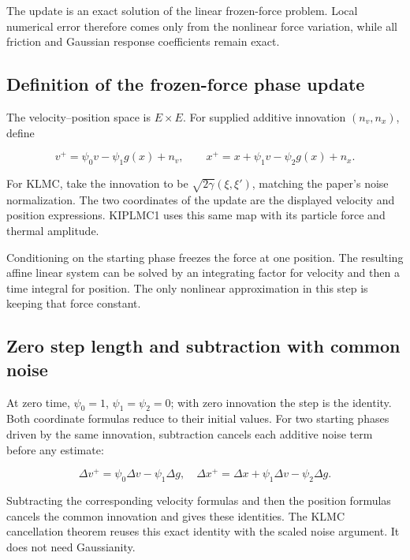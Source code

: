 \documentclass[11pt,a4paper]{report}
\begin{document}
The update is an exact solution of the linear frozen-force problem. Local numerical error therefore comes only from the nonlinear force variation, while all friction and Gaussian response coefficients remain exact.

\subsection{\texorpdfstring{Definition of the frozen-force phase update}{Definition of the frozen-force phase update}}
\label{report-step-KineticLangevin-Integrator-lean-1}


The velocity–position space is \(E\times E\). For supplied additive innovation \((n_v,n_x)\), define

\[v^+=\psi_0v-\psi_1g(x)+n_v,\qquad x^+=x+\psi_1v-\psi_2g(x)+n_x.\]

For KLMC, take the innovation to be \(\sqrt{2\gamma}(\xi,\xi')\), matching the paper's noise normalization. The two coordinates of the update are the displayed velocity and position expressions. KIPLMC1 uses this same map with its particle force and thermal amplitude.



Conditioning on the starting phase freezes the force at one position. The resulting affine linear system can be solved by an integrating factor for velocity and then a time integral for position. The only nonlinear approximation in this step is keeping that force constant.

\subsection{\texorpdfstring{Zero step length and subtraction with common noise}{Zero step length and subtraction with common noise}}
\label{report-step-KineticLangevin-Integrator-lean-2}


At zero time, \(\psi_0=1\), \(\psi_1=\psi_2=0\); with zero innovation the step is the identity. Both coordinate formulas reduce to their initial values. For two starting phases driven by the same innovation, subtraction cancels each additive noise term before any estimate:

\[\Delta v^+=\psi_0\Delta v-\psi_1\Delta g,\quad
\Delta x^+=\Delta x+\psi_1\Delta v-\psi_2\Delta g.\]

Subtracting the corresponding velocity formulas and then the position formulas cancels the common innovation and gives these identities. The KLMC cancellation theorem reuses this exact identity with the scaled noise argument. It does not need Gaussianity.
\end{document}
